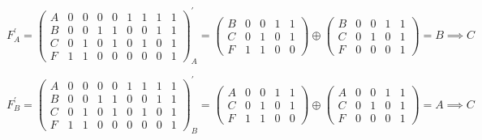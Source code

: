 \documentclass[a4paper,10pt]{article} %
\begin{document}
	\begin{equation}
		F^{\prime}_{A} = 
		\left(
		\begin{smallmatrix}
			A & 0 & 0 & 0 & 0 & 1 & 1 & 1 & 1 \\
			B & 0 & 0 & 1 & 1 & 0 & 0 & 1 & 1 \\
			C & 0 & 1 & 0 & 1 & 0 & 1 & 0 & 1 \\
			F & 1 & 1 & 0 & 0 & 0 & 0 & 0 & 1
		\end{smallmatrix}
		\right)^{\prime}_{A} = 
		\left(
		\begin{smallmatrix}
			B & 0 & 0 & 1 & 1 \\
			C & 0 & 1 & 0 & 1 \\
			F & 1 & 1 & 0 & 0
		\end{smallmatrix} 
		\right) \oplus \left(
		\begin{smallmatrix}
			B & 0 & 0 & 1 & 1 \\
			C & 0 & 1 & 0 & 1 \\
			F & 0 & 0 & 0 & 1
		\end{smallmatrix}
		\right)
		= B \implies C
	\end{equation}
	
	\begin{equation}
		F^{\prime}_{B} = 
		\left(
		\begin{smallmatrix}
			A & 0 & 0 & 0 & 0 & 1 & 1 & 1 & 1 \\
			B & 0 & 0 & 1 & 1 & 0 & 0 & 1 & 1 \\
			C & 0 & 1 & 0 & 1 & 0 & 1 & 0 & 1 \\
			F & 1 & 1 & 0 & 0 & 0 & 0 & 0 & 1
		\end{smallmatrix}
		\right) ^ {\prime}_{B} = 
		\left(
		\begin{smallmatrix}
			A & 0 & 0 & 1 & 1 \\
			C & 0 & 1 & 0 & 1 \\
			F & 1 & 1 & 0 & 0
		\end{smallmatrix}
		\right) \oplus 
		\left( 
		\begin{smallmatrix}
			A & 0 & 0 & 1 & 1 \\
			C & 0 & 1 & 0 & 1 \\
			F & 0 & 0 & 0 & 1
		\end{smallmatrix}  
		\right) 
		= A \implies C
	\end{equation}
\end{document}

